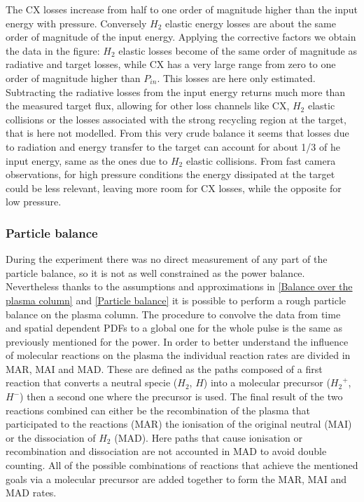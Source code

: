 The CX losses increase from half to one order of magnitude higher than the input energy with pressure. Conversely $H_2$ elastic energy losses are about the same order of magnitude of the input energy. Applying the corrective factors we obtain the data in the figure: $H_2$ elastic losses become of the same order of magnitude as radiative and target losses, while CX has a very large range from zero to one order of magnitude higher than $P_{in}$. This losses are here only estimated. Subtracting the radiative losses from the input energy returns much more than the measured target flux, allowing for other loss channels like CX, $H_2$ elastic collisions or the losses associated with the strong recycling region at the target, that is here not modelled. From this very crude balance it seems that losses due to radiation and energy transfer to the target can account for about 1/3 of he input energy, same as the ones due to $H_2$ elastic collisions. From fast camera observations, for high pressure conditions the energy dissipated at the target could be less relevant, leaving more room for CX losses, while the opposite for low pressure.

\subsubsection{Particle balance}\label{Particle balance bayesian}
During the experiment there was no direct measurement of any part of the particle balance, so it is not as well constrained as the power balance. Nevertheless thanks to the assumptions and approximations in \autoref{Balance over the plasma column} and \ref{Particle balance} it is possible to perform a rough particle balance on the plasma column. The procedure to convolve the data from time and spatial dependent PDFs to a global one for the whole pulse is the same as previously mentioned for the power. In order to better understand the influence of molecular reactions on the plasma the individual reaction rates are divided in MAR, MAI and MAD. These are defined as the paths composed of a first reaction that converts a neutral specie ($H_2$, $H$) into a molecular precursor (${H_2}^+$, $H^-$) then a second one where the precursor is used. The final result of the two reactions combined can either be the recombination of the plasma that participated to the reactions (MAR) the ionisation of the original neutral (MAI) or the dissociation of $H_2$ (MAD). Here paths that cause ionisation or recombination and dissociation are not accounted in MAD to avoid double counting. All of the possible combinations of reactions that achieve the mentioned goals via a molecular precursor are added together to form the MAR, MAI and MAD rates.\cite{Verhaegh2020} 

